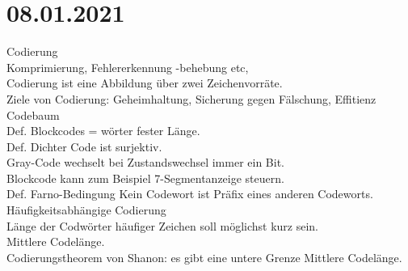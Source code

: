 \documentclass{article}
\begin{document}
	\section*{08.01.2021}
	Codierung \\
	Komprimierung, Fehlererkennung -behebung etc, \\
	Codierung ist eine Abbildung über zwei Zeichenvorräte. \\
	Ziele von Codierung: Geheimhaltung, Sicherung gegen Fälschung, Effitienz \\
	Codebaum \\
	Def. Blockcodes = wörter fester Länge. \\
	Def. Dichter Code ist surjektiv. \\
	Gray-Code wechselt bei Zustandswechsel immer ein Bit. \\
	Blockcode kann zum Beispiel 7-Segmentanzeige steuern. \\
	Def. Farno-Bedingung Kein Codewort ist Präfix eines anderen Codeworts. \\
	Häufigkeitsabhängige Codierung \\
	Länge der Codwörter häufiger Zeichen soll möglichst kurz sein. \\
	Mittlere Codelänge. \\
	Codierungstheorem von Shanon: es gibt eine untere Grenze Mittlere Codelänge. \\
\end{document}
